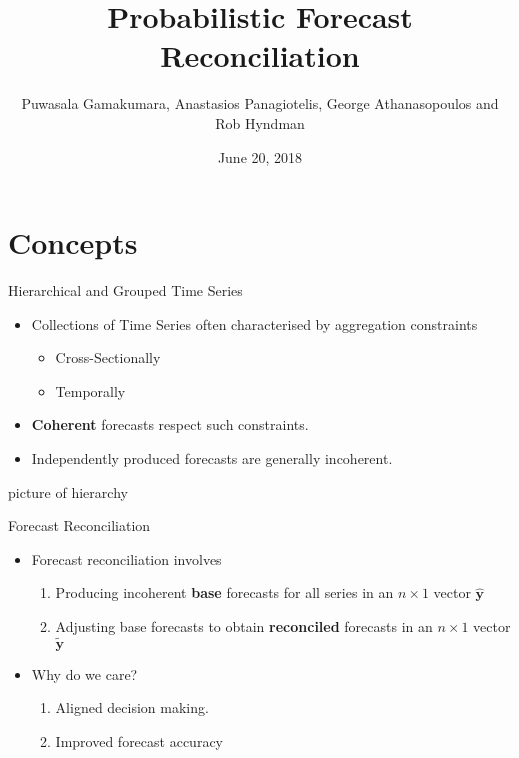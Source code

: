 \documentclass{beamer}
\title{Probabilistic Forecast Reconciliation}
\date{June 20, 2018}
\author[GPAH]{Puwasala Gamakumara, Anastasios Panagiotelis, George Athanasopoulos and Rob Hyndman}
\begin{document}
  \begin{frame}
    \maketitle
  \end{frame}
  \section{Concepts}
  \begin{frame}{Hierarchical and Grouped Time Series}
  	\begin{itemize}
  	  \item Collections of Time Series often characterised by aggregation constraints
  	  \begin{itemize}
  	    \item Cross-Sectionally
  		\item Temporally
  	  \end{itemize}
      \item {\bf Coherent} forecasts respect such constraints. 
      \item Independently produced forecasts are generally incoherent.
  \end{itemize}
  picture of hierarchy  
\end{frame}  
  \begin{frame}{Forecast Reconciliation}
  	\begin{itemize}
  	  \item Forecast reconciliation involves
  	  \begin{enumerate}
  	  	\item Producing incoherent {\bf base} forecasts for all series in an $n\times 1$ vector $\hat{\bm y}$
        \item Adjusting base forecasts to obtain {\bf reconciled} forecasts in an $n\times 1$ vector $\tilde{\bm y}$
  	  \end{enumerate} 
      \item Why do we care?
        \begin{enumerate}
        	\item Aligned decision making.
        	\item Improved forecast accuracy
        \end{enumerate}
  	\end{itemize}
  \end{frame}
\end{document}
